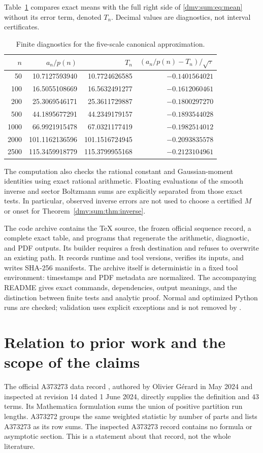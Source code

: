 \documentclass[11pt,letterpaper]{article}
\numberwithin{equation}{section}
\theoremstyle{definition}\newtheorem{definition}[theorem]{Definition}
\theoremstyle{remark}\newtheorem{remark}[theorem]{Remark}
\newcommand{\code}[1]{\texttt{\detokenize{#1}}}
\begin{document}
Table~\ref{dmv:sum:tab:diagnostic} compares exact means with the full right side of \eqref{dmv:sum:eq:mean} without its error term, denoted $T_n$. Decimal values are diagnostics, not interval certificates.
\begin{table}[htbp]
\centering\small
\begin{tabular}{r r r r}
\toprule
$n$ & $a_n/p(n)$ & $T_n$ & $(a_n/p(n)-T_n)/\sqrt\tau$\\
\midrule
50   & 10.7127593940 & 10.7724626585 & $-0.1401564021$\\
100  & 16.5055108669 & 16.5632491277 & $-0.1612060461$\\
200  & 25.3069546171 & 25.3611729887 & $-0.1800297270$\\
500  & 44.1895677291 & 44.2349179157 & $-0.1893544028$\\
1000 & 66.9921915478 & 67.0321177419 & $-0.1982514012$\\
2000 &101.1162136596 &101.1516724945 & $-0.2093835578$\\
2500 &115.3459918779 &115.3799955168 & $-0.2123104961$\\
\bottomrule
\end{tabular}
\caption{Finite diagnostics for the five-scale canonical approximation.}\label{dmv:sum:tab:diagnostic}
\end{table}

The computation also checks the rational constant and Gaussian-moment identities using exact rational arithmetic. Floating evaluations of the smooth inverse and sector Boltzmann sums are explicitly separated from those exact tests. In particular, observed inverse errors are not used to choose a certified $M$ or onset for Theorem~\ref{dmv:sum:thm:inverse}.

The code archive contains the TeX source, the frozen official sequence record, a complete exact table, and programs that regenerate the arithmetic, diagnostic, and PDF outputs. Its builder requires a fresh destination and refuses to overwrite an existing path. It records runtime and tool versions, verifies its inputs, and writes SHA-256 manifests. The archive itself is deterministic in a fixed tool environment: timestamps and PDF metadata are normalized. The accompanying README gives exact commands, dependencies, output meanings, and the distinction between finite tests and analytic proof. Normal and optimized Python runs are checked; validation uses explicit exceptions and is not removed by \code{python -O}.

\section{Relation to prior work and the scope of the claims}\label{dmv:sum:sec:sources}
The official A373273 data record \cite{oeisA373273}, authored by Olivier G\'erard in May 2024 and inspected at revision 14 dated 1 June 2024, directly supplies the definition and $43$ terms. Its Mathematica formulation sums the union of positive partition run lengths. A373272 \cite{triangle} groups the same weighted statistic by number of parts and lists A373273 as its row sums. The inspected A373273 record contains no formula or asymptotic section. This is a statement about that record, not the whole literature.
\end{document}
